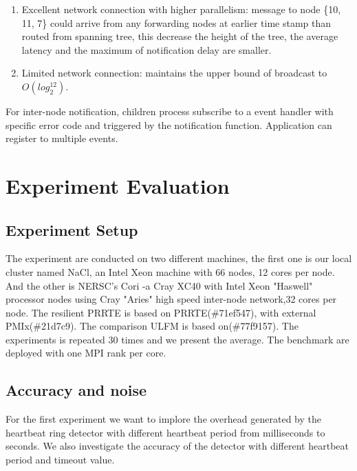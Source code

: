 \documentclass[sigconf]{acmart}
\begin{document}
\begin{enumerate}
  \item Excellent network connection with higher parallelism: message to node \{10, 11, 7\} could arrive from any forwarding nodes at earlier time stamp than routed from spanning tree, this decrease the height of the tree, the average latency and the maximum of notification delay are smaller.
  \item Limited network connection: maintains the upper bound of broadcast to $O(log_2^{12})$. 
\end{enumerate}
For inter-node notification, children process subscribe to a event handler with specific error code and triggered by the notification function. 
Application can register to multiple events.

\section{Experiment Evaluation}

\subsection{Experiment Setup}
The experiment are conducted on two different machines, the first one is our local cluster named NaCl, an Intel Xeon machine with 66 nodes, 12 cores per node. And the other is NERSC's Cori\cite{Cori01} -a Cray XC40 with Intel Xeon "Haswell" processor nodes using Cray "Aries" high speed inter-node network,32 cores per node. The resilient PRRTE is based on PRRTE(\#71ef547), with external PMIx(\#21d7c9). The comparison ULFM is based on(\#77f9157). The experiments is repeated 30 times and we present the average. The benchmark are deployed with one MPI rank per core. 
\subsection{Accuracy and noise}
For the first experiment we want to implore the overhead generated by the heartbeat ring detector with different heartbeat period from milliseconds to seconds. We also investigate the accuracy of the detector with different heartbeat period and timeout value. 
\end{document}
